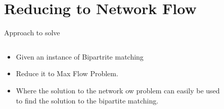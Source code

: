 \documentclass{beamer}
\begin{document}
\section{Reducing to Network Flow}
\begin{frame}{Approach to solve }
    \begin{columns}[T]
        \begin{column}{0.4\textwidth}
            \begin{itemize}
                \item Given an instance of Bipartrite matching
                \item Reduce it to Max Flow Problem.
                \item 
Where the solution to the
network 
ow problem can
easily be used to find the
solution to the bipartite
matching.
            \end{itemize}
        \end{column}
        
        \begin{column}{0.5\textwidth}
            \begin{figure}
                \centering
            \end{figure}
        \end{column}
    \end{columns}
\end{frame}
\end{document}
